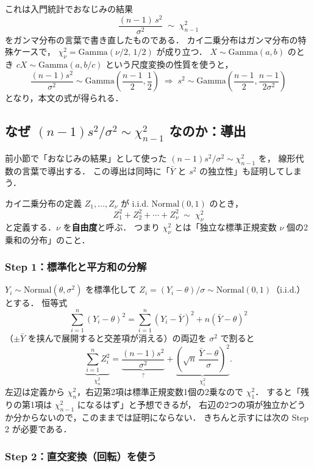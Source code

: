 \documentclass[lualatex,ja=standard,a4paper,12pt]{bxjsarticle}
\begin{document}
これは入門統計でおなじみの結果
\[
  \frac{(n-1)\,s^2}{\sigma^2} \;\sim\; \chi^2_{n-1}
\]
をガンマ分布の言葉で書き直したものである．
カイ二乗分布はガンマ分布の特殊ケースで，
$\chi^2_{\nu} = \mathrm{Gamma}(\nu/2,\, 1/2)$ が成り立つ．
$X \sim \mathrm{Gamma}(a, b)$ のとき $cX \sim \mathrm{Gamma}(a, b/c)$
という尺度変換の性質を使うと，
\[
  \frac{(n-1)s^2}{\sigma^2} \sim \mathrm{Gamma}\!\left(\frac{n-1}{2}, \frac{1}{2}\right)
  \;\Longrightarrow\;
  s^2 \sim \mathrm{Gamma}\!\left(\frac{n-1}{2}, \frac{n-1}{2\sigma^2}\right)
\]
となり，本文の式が得られる．

\subsection{なぜ $(n-1)s^2/\sigma^2 \sim \chi^2_{n-1}$ なのか：導出}

前小節で「おなじみの結果」として使った
$(n-1)s^2/\sigma^2 \sim \chi^2_{n-1}$ を，
線形代数の言葉で導出する．
この導出は同時に「$\bar{Y}$ と $s^2$ の独立性」も証明してしまう．

\begin{defbox}{カイ二乗分布の定義}
$Z_1, \ldots, Z_\nu$ が i.i.d. $\mathrm{Normal}(0,1)$ のとき，
\[
  Z_1^2 + Z_2^2 + \cdots + Z_\nu^2 \;\sim\; \chi^2_\nu
\]
と定義する．$\nu$ を\textbf{自由度}と呼ぶ．
つまり $\chi^2_\nu$ とは「独立な標準正規変数 $\nu$ 個の2乗和の分布」のこと．
\end{defbox}

\subsubsection*{Step 1：標準化と平方和の分解}

$Y_i \sim \mathrm{Normal}(\theta, \sigma^2)$ を標準化して
$Z_i = (Y_i - \theta)/\sigma \sim \mathrm{Normal}(0,1)$（i.i.d.）とする．
恒等式
\[
  \sum_{i=1}^n (Y_i - \theta)^2
  = \sum_{i=1}^n (Y_i - \bar{Y})^2 + n(\bar{Y} - \theta)^2
\]
（$\pm\bar{Y}$ を挟んで展開すると交差項が消える）の両辺を
$\sigma^2$ で割ると
\[
  \underbrace{\sum_{i=1}^n Z_i^2}_{\chi^2_n}
  = \underbrace{\frac{(n-1)s^2}{\sigma^2}}_{?}
  + \underbrace{\left(\sqrt{n}\,\frac{\bar{Y}-\theta}{\sigma}\right)^2}_{\chi^2_1}.
\]
左辺は定義から $\chi^2_n$，右辺第2項は標準正規変数1個の2乗なので $\chi^2_1$．
すると「残りの第1項は $\chi^2_{n-1}$ になるはず」と予想できるが，
右辺の2つの項が独立かどうか分からないので，このままでは証明にならない．
きちんと示すには次の Step 2 が必要である．

\subsubsection*{Step 2：直交変換（回転）を使う}
\end{document}
